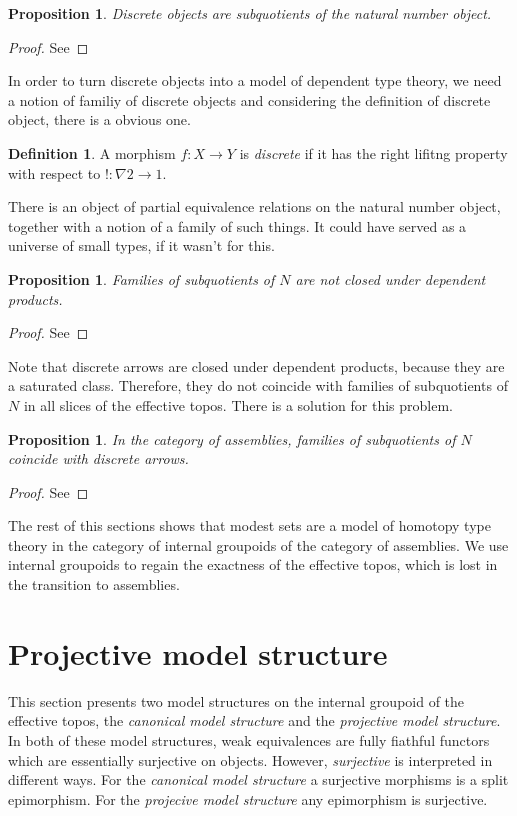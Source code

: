 \documentclass{amsart}
\theoremstyle{plain}
\newtheorem{prop}[theorem]{Proposition}
\theoremstyle{definition}
\newtheorem{defin}[theorem]{Definition}
\begin{document}
\begin{prop} Discrete objects are subquotients of the natural number object. \end{prop}

\begin{proof} See %
\end{proof}

In order to turn discrete objects into a model of dependent type theory, we need a notion of familiy of discrete objects and considering the definition of discrete object, there is a obvious one.

\begin{defin} A morphism $f:X\to Y$ is \emph{discrete} if it has the right lifitng property with respect to $!:\nabla 2\to 1$. \end{defin}

There is an object of partial equivalence relations on the natural number object, together with a notion of a family of such things. It could have served as a universe of small types, if it wasn't for this.

\begin{prop} Families of subquotients of $N$ are not closed under dependent products. \end{prop}

\begin{proof} See %
\end{proof}

Note that discrete arrows are closed under dependent products, because they are a saturated class. Therefore, they do not coincide with families of subquotients of $N$ in all slices of the effective topos. There is a solution for this problem.

\begin{prop} In the category of assemblies, families of subquotients of $N$ coincide with discrete arrows. \end{prop}

\begin{proof} See %
\end{proof}

The rest of this sections shows that modest sets are a model of homotopy type theory in the category of internal groupoids of the category of assemblies. We use internal groupoids to regain the exactness of the effective topos, which is lost in the transition to assemblies.



\section{Projective model structure}
This section presents two model structures on the internal groupoid of the effective topos, the \emph{canonical model structure} and the \emph{projective model structure}. In both of these model structures, weak equivalences are fully fiathful functors which are essentially surjective on objects. However, \emph{surjective} is interpreted in different ways. For the \emph{canonical model structure} a surjective morphisms is a split epimorphism. For the \emph{projecive model structure} any epimorphism is surjective.
\end{document}
